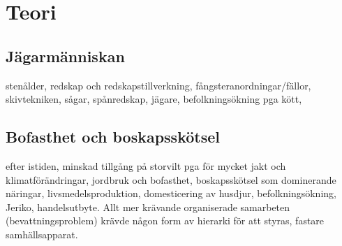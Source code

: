 \section{Teori}

\subsection{Jägarmänniskan}
stenålder, redskap och redskapstillverkning, fångsteranordningar/fällor, skivtekniken, sågar, spånredskap, jägare, befolkningsökning pga kött, 

\subsection{Bofasthet och boskapsskötsel}
efter istiden, minskad tillgång på storvilt pga för mycket jakt och klimatförändringar, jordbruk och bofasthet, boskapsskötsel som dominerande näringar, livsmedelsproduktion, domesticering av husdjur, befolkningsökning, Jeriko, handelsutbyte. Allt mer krävande organiserade samarbeten (bevattningsproblem) krävde någon form av hierarki för att styras, fastare samhällsapparat.   

